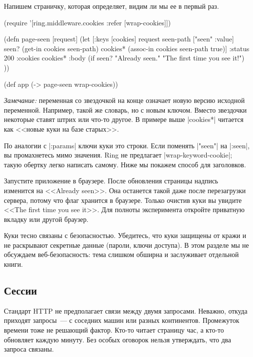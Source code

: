 Напишем страничку, которая определяет, видим ли мы ее в первый раз.

\begin{english}
  \begin{clojure}
(require '[ring.middleware.cookies
           :refer [wrap-cookies]])

(defn page-seen [request]
  (let [{:keys [cookies]} request
        seen-path ["seen" :value]
        seen? (get-in cookies seen-path)
        cookies* (assoc-in cookies seen-path true)]
    {:status 200
     :cookies cookies*
     :body (if seen?
             "Already seen."
             "The first time you see it!") }))

(def app (-> page-seen
             wrap-cookies))
  \end{clojure}
\end{english}

\emph{Замечание:} переменная со звездочкой на конце означает новую версию
исходной переменной. Например, такой же словарь, но с новым ключом. Вместо
звездочки некоторые ставят штрих или что-то другое. В примере выше
\spverb|cookies*| читается как <<новые куки на базе старых>>.

По аналогии с \spverb|:params| ключи куки это строки. Если поменять
\spverb|"seen"| на \spverb|:seen|, вы промахнетесь мимо значения. Ring не
предлагает \spverb|wrap-keyword-cookie|; такую обертку легко написать
самому. Ниже мы покажем способ для заголовков.

Запустите приложение в браузере. После обновления страницы надпись изменится на
<<Already seen>>. Она останется такой даже после перезагрузки сервера, потому
что флаг хранится в браузере. Только очистив куки вы увидите <<The first time
you see it>>. Для полноты эксперимента откройте приватную вкладку или другой
браузер.

Куки тесно связаны с безопасностью. Убедитесь, что куки защищены от кражи и не
раскрывают секретные данные (пароли, ключи доступа). В этом разделе мы не
обсуждаем веб-безопасность: тема слишком обширна и заслуживает отдельной книги.

\subsection{Сессии}

Стандарт HTTP не предполагает связи между двумя запросами. Неважно, откуда
приходят запросы~--- с соседних машин или разных континентов. Промежуток времени
тоже не решающий фактор. Кто-то читает страницу час, а кто-то обновляет каждую
минуту. Без особых оговорок нельзя утверждать, что два запроса связаны.

